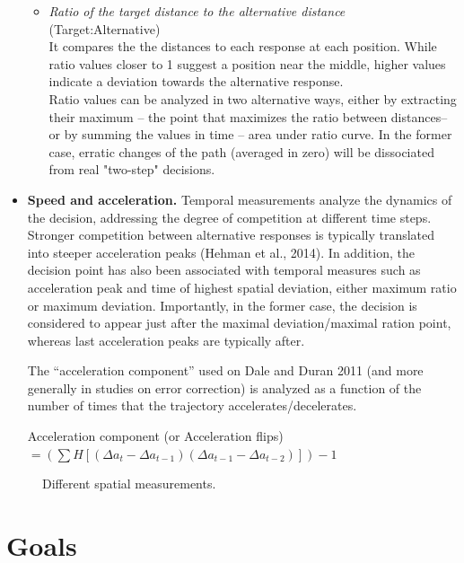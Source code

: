 \documentclass{article}
\begin{document}
\begin{itemize}
\begin{itemize}
\item \textit{Ratio of the target distance to the alternative distance} (Target:Alternative) 
\\ It compares the the distances to each response at each position. While ratio values closer to 1 suggest a position near the middle, higher values indicate a deviation towards the alternative response.  
\\Ratio values can be analyzed in two alternative ways, either by extracting their maximum -- the point that maximizes the ratio between distances-- or by summing the values in time -- area under ratio curve. In the former case, erratic changes of the path (averaged in zero) will be dissociated from real "two-step" decisions. 
\end{itemize}

\item \textbf{Speed and acceleration.} Temporal measurements analyze the dynamics of the decision, addressing the degree of competition at different time steps. 
Stronger competition between alternative responses is typically translated into steeper  acceleration peaks (Hehman et al., 2014). In addition, the decision point has also been associated with temporal measures such as acceleration peak and time of highest spatial deviation, either maximum ratio or maximum deviation. Importantly, in the former case, the decision is considered to appear just after the maximal deviation/maximal ration point, whereas last acceleration peaks are typically after.

The ``acceleration component'' used on Dale and Duran 2011 (and more generally in studies on error correction) is analyzed as a function of the number of times that the trajectory accelerates/decelerates. 

Acceleration component (or Acceleration flips) \(= (\sum H[(\Delta a_{t} - \Delta a_{t-1})(\Delta a_{t-1} - \Delta a_{t-2})])-1 \)

\end{itemize}

\begin{figure}
\caption{Different spatial measurements.}
\end{figure}


\section{Goals}
\end{document}
